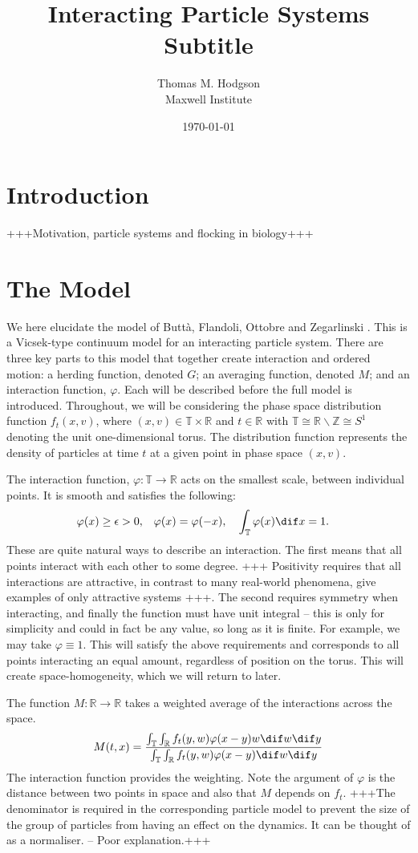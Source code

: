 \documentclass[11pt, a4pape draft]{article}
\title{{\huge Interacting Particle Systems} \\\vspace{1cm} Subtitle}
\author{Thomas M. Hodgson\\ \vspace{0.5cm} Maxwell Institute}
\date{\today}
\renewcommand{\phi}{\varphi}
\renewcommand{\R}{\mathbb{R}}
\newcommand{\T}{\mathbb{T}}
\newcommand{\Z}{\mathbb{Z}}
\begin{document}
	\maketitle
	\newpage
	\tableofcontents
	\listoffigures
	\newpage
	\section{Introduction}
	+++Motivation, particle systems and flocking in biology+++
	\section{The Model}\label{sec:model}
		We here elucidate the model of Butt\`a, Flandoli, Ottobre and Zegarlinski \cite{Butta2019}. This is a Vicsek-type continuum model for an interacting particle system. There are three key parts to this model that together create interaction and ordered motion: a herding function, denoted $G$; an averaging function, denoted $M$; and an interaction function, $\phi$. Each will be described before the full model is introduced. Throughout, we will be considering the phase space distribution function $f_t(x,v)$, where $(x,v) \in \T \times \R$ and $t \in \R$ with $\T \cong \R \backslash \Z \cong S^1$ denoting the unit one-dimensional torus. The distribution function represents the density of particles at time $t$ at a given point in phase space $(x,v)$.
		
		The interaction function, $\phi: \T \to \R $ acts on the smallest scale, between individual points. It is smooth and satisfies the following:
		\begin{align*}
			\phi(x) \geq \epsilon >0, && \phi(x) = \phi(-x), &&& \int_{\T} \phi(x) \dif x = 1.
		\end{align*}
		These are quite natural ways to describe an interaction. The first means that all points interact with each other to some degree. +++ Positivity requires that all interactions are attractive, in contrast to many real-world phenomena, give examples of only attractive systems +++. The second requires symmetry when interacting, and finally the function must have unit integral -- this is only for simplicity and could in fact be any value, so long as it is finite. For example, we may take $\phi \equiv 1$. This will satisfy the above requirements and corresponds to all points interacting an equal amount, regardless of position on the torus. This will create space-homogeneity, which we will return to later.
		
		The function $M:\R \to \R$ takes a weighted average of the interactions across the space.	
		\[ 
			M(t,x) = \frac{\int_{\T}\int_{\R}f_t(y,w)\phi(x-y)w\dif w \dif y}{\int_{\T}\int_{\R}f_t(y,w)\phi(x-y)\dif w \dif y}
		\]
		The interaction function provides the weighting. Note the argument of  $\phi$ is the distance between two points in space and also that $M$ depends on $f_t$. +++The denominator is required in the corresponding particle model to prevent the size of the group of particles from having an effect on the dynamics. It can be thought of as a normaliser. -- Poor explanation.+++
		
\end{document}

